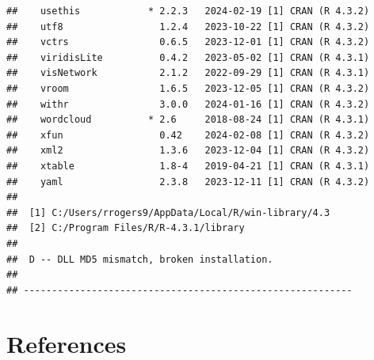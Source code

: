 \documentclass[print]{nuthesis}
\begin{document}
\begin{verbatim}
##    usethis            * 2.2.3   2024-02-19 [1] CRAN (R 4.3.2)
##    utf8                 1.2.4   2023-10-22 [1] CRAN (R 4.3.2)
##    vctrs                0.6.5   2023-12-01 [1] CRAN (R 4.3.2)
##    viridisLite          0.4.2   2023-05-02 [1] CRAN (R 4.3.1)
##    visNetwork           2.1.2   2022-09-29 [1] CRAN (R 4.3.1)
##    vroom                1.6.5   2023-12-05 [1] CRAN (R 4.3.2)
##    withr                3.0.0   2024-01-16 [1] CRAN (R 4.3.2)
##    wordcloud          * 2.6     2018-08-24 [1] CRAN (R 4.3.1)
##    xfun                 0.42    2024-02-08 [1] CRAN (R 4.3.2)
##    xml2                 1.3.6   2023-12-04 [1] CRAN (R 4.3.2)
##    xtable               1.8-4   2019-04-21 [1] CRAN (R 4.3.1)
##    yaml                 2.3.8   2023-12-11 [1] CRAN (R 4.3.2)
## 
##  [1] C:/Users/rrogers9/AppData/Local/R/win-library/4.3
##  [2] C:/Program Files/R/R-4.3.1/library
## 
##  D -- DLL MD5 mismatch, broken installation.
## 
## ----------------------------------------------------------
\end{verbatim}

\backmatter

\hypertarget{references}{%
\chapter*{References}\label{references}}

\noindent

\setlength{\parindent}{-0.20in}
\setlength{\leftskip}{0.20in}
\setlength{\parskip}{8pt}
\end{document}
